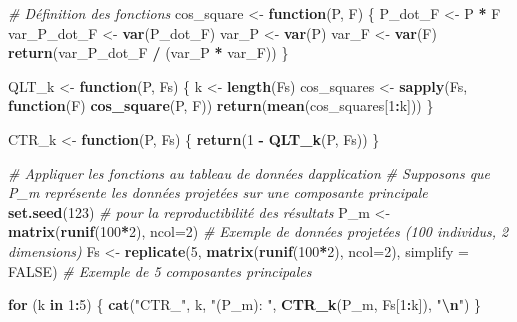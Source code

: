 \documentclass[
]{article}
\newenvironment{Shaded}{\begin{snugshade}}{\end{snugshade}}
\newcommand{\AttributeTok}[1]{\textcolor[rgb]{0.13,0.29,0.53}{#1}}
\newcommand{\CommentTok}[1]{\textcolor[rgb]{0.56,0.35,0.01}{\textit{#1}}}
\newcommand{\ConstantTok}[1]{\textcolor[rgb]{0.56,0.35,0.01}{#1}}
\newcommand{\ControlFlowTok}[1]{\textcolor[rgb]{0.13,0.29,0.53}{\textbf{#1}}}
\newcommand{\DecValTok}[1]{\textcolor[rgb]{0.00,0.00,0.81}{#1}}
\newcommand{\FunctionTok}[1]{\textcolor[rgb]{0.13,0.29,0.53}{\textbf{#1}}}
\newcommand{\NormalTok}[1]{#1}
\newcommand{\OtherTok}[1]{\textcolor[rgb]{0.56,0.35,0.01}{#1}}
\newcommand{\SpecialCharTok}[1]{\textcolor[rgb]{0.81,0.36,0.00}{\textbf{#1}}}
\newcommand{\StringTok}[1]{\textcolor[rgb]{0.31,0.60,0.02}{#1}}
\begin{document}
\begin{Shaded}
\begin{Highlighting}[]
\CommentTok{\# Définition des fonctions}
\NormalTok{cos\_square }\OtherTok{\textless{}{-}} \ControlFlowTok{function}\NormalTok{(P, F) \{}
\NormalTok{  P\_dot\_F }\OtherTok{\textless{}{-}}\NormalTok{ P }\SpecialCharTok{*}\NormalTok{ F}
\NormalTok{  var\_P\_dot\_F }\OtherTok{\textless{}{-}} \FunctionTok{var}\NormalTok{(P\_dot\_F)}
\NormalTok{  var\_P }\OtherTok{\textless{}{-}} \FunctionTok{var}\NormalTok{(P)}
\NormalTok{  var\_F }\OtherTok{\textless{}{-}} \FunctionTok{var}\NormalTok{(F)}
  \FunctionTok{return}\NormalTok{(var\_P\_dot\_F }\SpecialCharTok{/}\NormalTok{ (var\_P }\SpecialCharTok{*}\NormalTok{ var\_F))}
\NormalTok{\}}

\NormalTok{QLT\_k }\OtherTok{\textless{}{-}} \ControlFlowTok{function}\NormalTok{(P, Fs) \{}
\NormalTok{  k }\OtherTok{\textless{}{-}} \FunctionTok{length}\NormalTok{(Fs)}
\NormalTok{  cos\_squares }\OtherTok{\textless{}{-}} \FunctionTok{sapply}\NormalTok{(Fs, }\ControlFlowTok{function}\NormalTok{(F) }\FunctionTok{cos\_square}\NormalTok{(P, F))}
  \FunctionTok{return}\NormalTok{(}\FunctionTok{mean}\NormalTok{(cos\_squares[}\DecValTok{1}\SpecialCharTok{:}\NormalTok{k]))}
\NormalTok{\}}

\NormalTok{CTR\_k }\OtherTok{\textless{}{-}} \ControlFlowTok{function}\NormalTok{(P, Fs) \{}
  \FunctionTok{return}\NormalTok{(}\DecValTok{1} \SpecialCharTok{{-}} \FunctionTok{QLT\_k}\NormalTok{(P, Fs))}
\NormalTok{\}}

\CommentTok{\# Appliquer les fonctions au tableau de données d\textquotesingle{}application}
\CommentTok{\# Supposons que P\_m représente les données projetées sur une composante principale}
\FunctionTok{set.seed}\NormalTok{(}\DecValTok{123}\NormalTok{)  }\CommentTok{\# pour la reproductibilité des résultats}
\NormalTok{P\_m }\OtherTok{\textless{}{-}} \FunctionTok{matrix}\NormalTok{(}\FunctionTok{runif}\NormalTok{(}\DecValTok{100}\SpecialCharTok{*}\DecValTok{2}\NormalTok{), }\AttributeTok{ncol=}\DecValTok{2}\NormalTok{)  }\CommentTok{\# Exemple de données projetées (100 individus, 2 dimensions)}
\NormalTok{Fs }\OtherTok{\textless{}{-}} \FunctionTok{replicate}\NormalTok{(}\DecValTok{5}\NormalTok{, }\FunctionTok{matrix}\NormalTok{(}\FunctionTok{runif}\NormalTok{(}\DecValTok{100}\SpecialCharTok{*}\DecValTok{2}\NormalTok{), }\AttributeTok{ncol=}\DecValTok{2}\NormalTok{), }\AttributeTok{simplify =} \ConstantTok{FALSE}\NormalTok{)  }\CommentTok{\# Exemple de 5 composantes principales}

\ControlFlowTok{for}\NormalTok{ (k }\ControlFlowTok{in} \DecValTok{1}\SpecialCharTok{:}\DecValTok{5}\NormalTok{) \{}
  \FunctionTok{cat}\NormalTok{(}\StringTok{"CTR\_"}\NormalTok{, k, }\StringTok{"(P\_m): "}\NormalTok{, }\FunctionTok{CTR\_k}\NormalTok{(P\_m, Fs[}\DecValTok{1}\SpecialCharTok{:}\NormalTok{k]), }\StringTok{"}\SpecialCharTok{\textbackslash{}n}\StringTok{"}\NormalTok{)}
\NormalTok{\}}
\end{Highlighting}
\end{Shaded}
\end{document}
